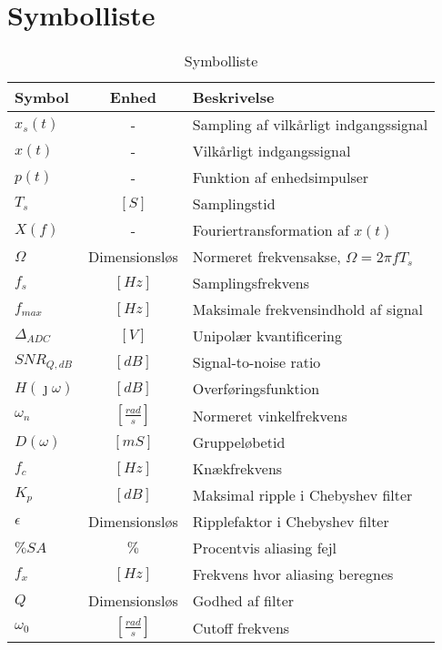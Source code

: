 \chapter{Symbolliste} \label{bilag:symbolliste}
\begin{table}[ht!]
	\caption{Symbolliste}
	\label{tab:symbolliste}
	\begin{threeparttable}
		\begin{tabular}{l c p{}}
			\toprule
			\textbf{Symbol}      &
			\textbf{Enhed} & \textbf{Beskrivelse} \\
			\midrule
			$x_s(t)$ &	- & Sampling af vilkårligt indgangssignal \\
			$x(t)$   & 	- &  Vilkårligt indgangssignal \\
			$p(t)$	 & - & 	Funktion af enhedsimpulser \\
			$T_s$ 	 & $\left[\si{S}\right]$ & Samplingstid \\ 
			$X(f)$ &  -	 &	Fouriertransformation af $x(t)$ \\
			$\Omega$ & Dimensionsløs & Normeret frekvensakse, $\Omega = 2 \pi f T_s$ \\
			$f_s$ &	$\left[\si{Hz}\right]$ & Samplingsfrekvens \\
			$f_{max}$ & $\left[\si{Hz}\right]$ & Maksimale frekvensindhold af signal \\
			$\Delta_{ADC}$ & $[\si{V}]$ & Unipolær kvantificering \\
			$SNR_{Q, dB}$ & $[\si{dB}]$ & Signal-to-noise ratio \\
			$H(\jmath \omega)$ & $\left[\si{dB}\right]$ & Overføringsfunktion\\
			$\omega_n$ & $\left[\si{\frac{rad}{s}}\right]$ &  Normeret vinkelfrekvens \\
			$D(\omega)$ & $\left[\si{mS}\right]$ &  Gruppeløbetid \\
			$f_c$ & $\left[\si{Hz}\right]$ & Knækfrekvens \\
			$K_p$ & $\left[\si{dB}\right]$ & Maksimal ripple i Chebyshev filter \\
			$\epsilon$ & Dimensionsløs & Ripplefaktor i Chebyshev filter \\
			$\%SA$ & $\%$ & Procentvis aliasing fejl\\
			$f_x$ & $\left[\si{Hz}\right]$ & Frekvens hvor aliasing beregnes\\
			$Q$ & Dimensionsløs & Godhed af filter \\
			$\omega_0$ & $\left[\si{\frac{rad}{s}}\right]$ & Cutoff frekvens\\

\end{tabular}
\end{threeparttable}
\end{table}
